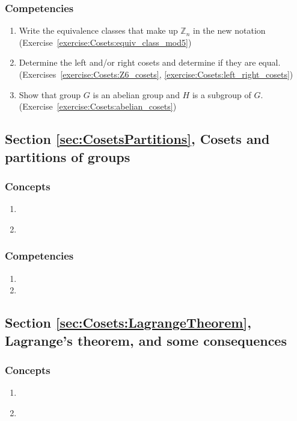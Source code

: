 \subsubsection*{Competencies}
\begin{enumerate}
\item
Write the equivalence classes that make up ${\mathbb Z}_n$ in the new notation (Exercise~\ref{exercise:Cosets:equiv_class_mod5})
\item
Determine the left and/or right cosets and determine if they are equal. (Exercises~\ref{exercise:Cosets:Z6_cosets}, \ref{exercise:Cosets:left_right_cosets})
\item
Show that group $G$ is an abelian group and $H$ is a subgroup of $G$. (Exercise~\ref{exercise:Cosets:abelian_cosets})
\end{enumerate}


\subsection*{Section \ref{sec:CosetsPartitions}, Cosets and partitions of groups}
\subsubsection*{Concepts}
\begin{enumerate}
\item 
\
\
\
\item
\end{enumerate}

\subsubsection*{Competencies}
\begin{enumerate}
\item
\item
\end{enumerate}


\subsection*{Section \ref{sec:Cosets:LagrangeTheorem}, Lagrange's theorem, and some consequences}
\subsubsection*{Concepts}
\begin{enumerate}
\item 
\
\
\
\item
\end{enumerate}

